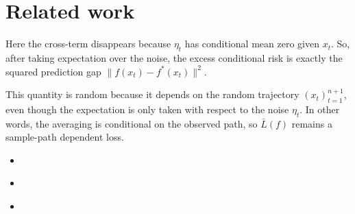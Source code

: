 \documentclass[11pt]{article}
\newcommand{\condemploss}{\bar{L}}
\begin{document}
\section{Related work}
%
Here the cross-term disappears because \(\eta_t\) has conditional mean zero given \(x_t\).
So, after taking expectation over the noise, the excess conditional risk is exactly the squared prediction gap \(\|f(x_t)-f^*(x_t)\|^2\).

%
This quantity is random because it depends on the random trajectory \((x_t)_{t=1}^{n+1}\), even though the expectation is only taken with respect to the noise \(\eta_t\).
In other words, the averaging is conditional on the observed path, so \(\condemploss(f)\) remains a sample-path dependent loss.









\begin{itemize}
\item \cite{baraud2001adaptive}
\item \cite{van2002hoeffding}
\item \cite{oymak2018stochastic}
\end{itemize}

\appendix

%

\end{document}
